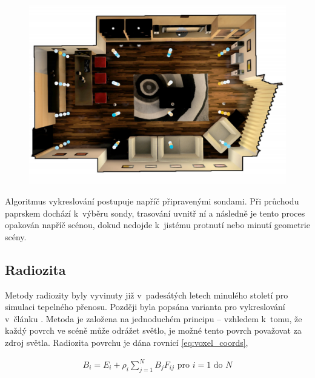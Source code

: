 \begin{figure}[H]
	\centering
	\captionsetup{justification=centering}
	\includegraphics[scale=0.25]{obrazky-figures/light_field_probes.png}
	\label{fig:probes_in_scene}
\end{figure}

Algoritmus vykreslování postupuje napříč připravenými sondami. Při průchodu paprskem dochází k~výběru sondy, trasování uvnitř ní a následně je tento proces opakován napříč scénou, dokud nedojde k~jistému protnutí nebo minutí geometrie scény.

\subsection{Radiozita}
Metody radiozity byly vyvinuty již v~padesátých letech minulého století pro simulaci tepelného přenosu. Později byla popsána varianta pro vykreslování v~článku \cite{radiosity}. Metoda je založena na jednoduchém principu -- vzhledem k~tomu, že každý povrch ve scéně může odrážet světlo, je možné tento povrch považovat za zdroj světla. Radiozita povrchu je dána rovnicí \ref{eq:voxel_coords},


\begin{equation} \label{eq:voxel_coords}
	\begin{gathered}
		B_i = E_i + \rho_i \sum^N_{j = 1}B_jF_{ij} \text{ pro } i = 1 \text{ do } N
	\end{gathered}
\end{equation}

